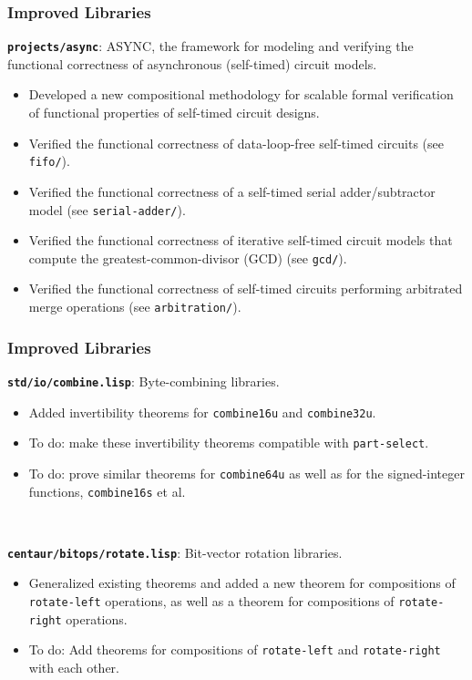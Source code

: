 \documentclass{beamer}
\newcommand{\code}[1]{\texttt{#1}}
\newcommand{\bookpath}[1]{\textbf{\code{#1}}}
\newcommand{\implibtitle}{\frametitle{Improved Libraries}}
\begin{document}

\begin{frame}

\implibtitle

\bookpath{projects/async}:
ASYNC, the framework for modeling and verifying the functional correctness
of asynchronous (self-timed) circuit models.
\begin{itemize}
\item
Developed a new compositional methodology for scalable formal
verification of functional properties of self-timed circuit designs.
\item
Verified the functional correctness of data-loop-free self-timed
circuits (see \code{fifo/}).
\item
Verified the functional correctness of a self-timed serial
adder/subtractor model (see \code{serial-adder/}).
\item
Verified the functional correctness of iterative self-timed circuit
models that compute the greatest-common-divisor (GCD) (see \code{gcd/}).
\item
Verified the functional correctness of self-timed circuits performing
arbitrated merge operations (see \code{arbitration/}).
\end{itemize}

\end{frame}


\begin{frame}

\implibtitle

\bookpath{std/io/combine.lisp}:
Byte-combining libraries.
\begin{itemize}
\item
Added invertibility theorems for \code{combine16u} and \code{combine32u}.
\item
To do: make these invertibility theorems compatible with \code{part-select}.
\item
To do: prove similar theorems for \code{combine64u} as well as for the
signed-integer functions, \code{combine16s} et al.
\end{itemize}

\

\bookpath{centaur/bitops/rotate.lisp}:
Bit-vector rotation libraries.
\begin{itemize}
\item
Generalized existing theorems and added a new theorem for compositions
of \code{rotate-left} operations, as well as a theorem for
compositions of \code{rotate-right} operations.
\item
To do: Add theorems for compositions of \code{rotate-left} and
\code{rotate-right} with each other.
\end{itemize}

\end{frame}
\end{document}
